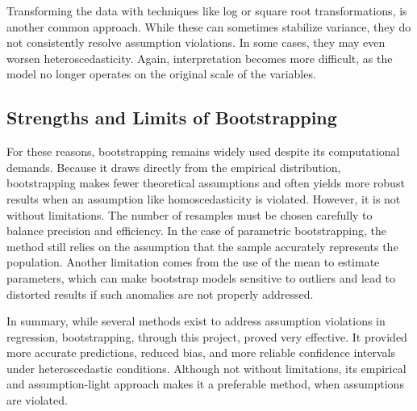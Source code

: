 \noindent Transforming the data with techniques like log or square root transformations, is another common approach. While these can sometimes stabilize variance, they do not consistently resolve assumption violations. In some cases, they may even worsen heteroscedasticity. Again, interpretation becomes more difficult, as the model no longer operates on the original scale of the variables.


\subsection{Strengths and Limits of Bootstrapping}
For these reasons, bootstrapping remains widely used despite its computational demands. Because it draws directly from the empirical distribution, bootstrapping makes fewer theoretical assumptions and often yields more robust results when an assumption like homoscedasticity is violated. However, it is not without limitations. The number of resamples must be chosen carefully to balance precision and efficiency. In the case of parametric bootstrapping, the method still relies on the assumption that the sample accurately represents the population. Another limitation comes from the use of the mean to estimate parameters, which can make bootstrap models sensitive to outliers and lead to distorted results if such anomalies are not properly addressed.

\noindent In summary, while several methods exist to address assumption violations in regression, bootstrapping, through this project, proved very effective. It provided more accurate predictions, reduced bias, and more reliable confidence intervals under heteroscedastic conditions. Although not without limitations, its empirical and assumption-light approach makes it a preferable method, when assumptions are violated.